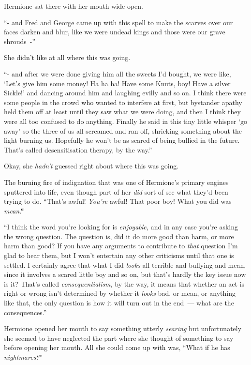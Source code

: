 Hermione sat there with her mouth wide open.

``- and Fred and George came up with this spell to make the scarves over our faces darken and blur, like we were undead kings and those were our grave shrouds~-''

She didn't like at all where this was going.

``- and after we were done giving him all the sweets I'd bought, we were like, `Let's give him some money! Ha ha ha! Have some Knuts, boy! Have a silver Sickle!' and dancing around him and laughing evilly and so on. I think there were some people in the crowd who wanted to interfere at first, but bystander apathy held them off at least until they saw what we were doing, and then I think they were all too confused to do anything. Finally he said in this tiny little whisper `go away' so the three of us all screamed and ran off, shrieking something about the light burning us. Hopefully he won't be as scared of being bullied in the future. That's called desensitisation therapy, by the way.''

Okay, she \emph{hadn't} guessed right about where this was going.

The burning fire of indignation that was one of Hermione's primary engines sputtered into life, even though part of her \emph{did} sort of see what they'd been trying to do. ``That's awful! \emph{You're} awful! That poor boy! What you did was \emph{mean!}''

``I think the word you're looking for is \emph{enjoyable,} and in any case you're asking the wrong question. The question is, did it do more good than harm, or more harm than good? If you have any arguments to contribute to \emph{that} question I'm glad to hear them, but I won't entertain any other criticisms until that one is settled. I certainly agree that what I did \emph{looks} all terrible and bullying and mean, since it involves a scared little boy and so on, but that's hardly the key issue now is it? That's called \emph{consequentialism,} by the way, it means that whether an act is right or wrong isn't determined by whether it \emph{looks} bad, or mean, or anything like that, the only question is how it will turn out in the end~--- what are the consequences.''

Hermione opened her mouth to say something utterly \emph{searing} but unfortunately she seemed to have neglected the part where she thought of something to say before opening her mouth. All she could come up with was, ``What if he has \emph{nightmares?}''

